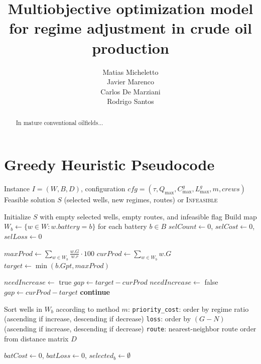 \documentclass[a4paper,11pt]{article}
\title{Multiobjective optimization model for regime adjustment in crude oil production}
\author{
    Matias Micheletto\\
    Javier Marenco\\
    Carlos De Marziani\\
    Rodrigo Santos
}
\date{}
\begin{document}
\maketitle

\begin{abstract}
    In mature conventional oilfields...      
\end{abstract}

\section{Greedy Heuristic Pseudocode}

\Needspace{12cm}
\begin{algorithm}[H]
\caption{Greedy solver for regime adjustment and crew routing}
\label{alg:greedy_solver}
\begin{algorithmic}[1]
\Require Instance $I=(W,B,D)$, configuration $cfg=(\tau, Q_{\max}, C_{\max}^{g}, L_{\max}^{g}, m, crews)$
\Ensure Feasible solution $S$ (selected wells, new regimes, routes) or \textsc{Infeasible}

\State Initialize $S$ with empty selected wells, empty routes, and infeasible flag
\State Build map $W_b \gets \{w \in W : w.battery = b\}$ for each battery $b \in B$
\State $selCount \gets 0$, $selCost \gets 0$, $selLoss \gets 0$

    \State $maxProd \gets \sum_{w \in W_b} \frac{w.G}{w.r} \cdot 100$
    \State $curProd \gets \sum_{w \in W_b} w.G$
    \State $target \gets \min(b.Gpt, maxProd)$

        \State $needIncrease \gets$ true
        \State $gap \gets target - curProd$
        \State $needIncrease \gets$ false
        \State $gap \gets curProd - target$
    \Else
        \State \textbf{continue} 
    \EndIf

    \State Sort wells in $W_b$ according to method $m$:
    \Statex \hspace{1em} \texttt{priority\_cost}: order by regime ratio (ascending if increase, descending if decrease)
    \Statex \hspace{1em} \texttt{loss}: order by $(G-N)$ (ascending if increase, descending if decrease)
    \Statex \hspace{1em} \texttt{route}: nearest-neighbor route order from distance matrix $D$

    \State $batCost \gets 0$, $batLoss \gets 0$, $selected_b \gets \emptyset$


\end{algorithmic}
\end{algorithm}
\end{document}
